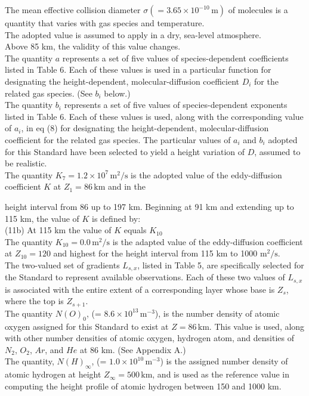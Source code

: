 \documentclass{article}
\begin{document}
The mean effective collision diameter $\sigma (= 3.65 \times 10^{-10} \, \mathrm{m})$ of molecules is a quantity that varies with gas species and temperature.\\
The adopted value is assumed to apply in a dry, sea-level atmosphere.\\
Above 85 km, the validity of this value changes.\\
\noindent The quantity $a$ represents a set of five values of species-dependent coefficients listed in Table 6. Each of these values is used in a particular function for designating the height-dependent, molecular-diffusion coefficient $D_i$ for the related gas species. (See $b_i$ below.)\\
\noindent The quantity $b_i$ represents a set of five values of species-dependent exponents listed in Table 6. Each of these values is used, along with the corresponding value of $a_i$, in eq (8) for designating the height-dependent, molecular-diffusion coefficient for the related gas species. The particular values of $a_i$ and $b_i$ adopted for this Standard have been selected to yield a height variation of $D$, assumed to be realistic.\\
The quantity $K_7 = 1.2 \times 10^7 \, \mathrm{m^2/s}$ is the adopted value of the eddy-diffusion coefficient $K$ at $Z_1 = 86 \, \mathrm{km}$ and in the

height interval from 86 up to 197 km. Beginning at 91 km and extending up to 115 km, the value of $K$ is defined by:\\
(11b) At 115 km the value of $K$ equals $K_{10}$\\
The quantity $K_{10} = 0.0 \, \text{m}^2/\text{s}$ is the adapted value of the eddy-diffusion coefficient at $Z_{10} = 120$ and highest for the height interval from 115 km to 1000 $ \text{m}^2/\text{s}$.\\
The two-valued set of gradients $L_{s,x}$, listed in Table 5, are specifically selected for the Standard to represent available observations. Each of these two values of $L_{s,x}$ is associated with the entire extent of a corresponding layer whose base is $Z_s$, where the top is $Z_{s+1}$.\\
The quantity $N(O)_0$, (= $8.6 \times 10^{13} \, \text{m}^{-3}$), is the number density of atomic oxygen assigned for this Standard to exist at $Z = 86 \, \text{km}$. This value is used, along with other number densities of atomic oxygen, hydrogen atom, and densities of $N_2$, $O_2$, $Ar$, and $He$ at 86 km. (See Appendix A.)\\
The quantity, $N(H)_\infty$, (= $1.0 \times 10^{10} \, \text{m}^{-3}$) is the assigned number density of atomic hydrogen at height $Z_\infty = 500 \, \text{km}$, and is used as the reference value in computing the height profile of atomic hydrogen between 150 and 1000 km.\\
\end{document}
